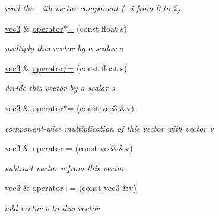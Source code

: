 \begin{DoxyCompactItemize}
\begin{DoxyCompactList}\small\item\em read the \+\_\+i\textquotesingle{}th vector component (\+\_\+i from 0 to 2) \end{DoxyCompactList}\item 
\hyperlink{classvec3}{vec3} \& \hyperlink{classvec3_aa35e4d03e4840e1e921fa9bfe91a54c9}{operator$\ast$=} (const float s)
\begin{DoxyCompactList}\small\item\em multiply this vector by a scalar {\ttfamily s} \end{DoxyCompactList}\item 
\hyperlink{classvec3}{vec3} \& \hyperlink{classvec3_a1449e367f5372e591e0c42cb5f49081c}{operator/=} (const float s)
\begin{DoxyCompactList}\small\item\em divide this vector by a scalar {\ttfamily s} \end{DoxyCompactList}\item 
\hyperlink{classvec3}{vec3} \& \hyperlink{classvec3_af48643b0cc8c7065df1dd001c50b55a3}{operator$\ast$=} (const \hyperlink{classvec3}{vec3} \&v)
\begin{DoxyCompactList}\small\item\em component-\/wise multiplication of this vector with vector {\ttfamily v} \end{DoxyCompactList}\item 
\hyperlink{classvec3}{vec3} \& \hyperlink{classvec3_aae14957b5530407e22095bfadcb98611}{operator-\/=} (const \hyperlink{classvec3}{vec3} \&v)
\begin{DoxyCompactList}\small\item\em subtract vector {\ttfamily v} from this vector \end{DoxyCompactList}\item 
\hyperlink{classvec3}{vec3} \& \hyperlink{classvec3_a68fcdd8a705437648ee8d3a1e74f6165}{operator+=} (const \hyperlink{classvec3}{vec3} \&v)
\begin{DoxyCompactList}\small\item\em add vector {\ttfamily v} to this vector \end{DoxyCompactList}\end{DoxyCompactItemize}
